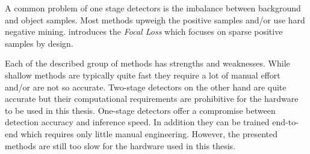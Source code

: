 	A common problem of one stage detectors is the imbalance between background and object samples. Most methods upweigh the positive samples and/or use hard negative mining. \cite{Lin} introduces the \textit{Focal Loss} which focuses on sparse positive samples by design.
	
	Each of the described group of methods has strengths and weaknesses. While shallow methods are typically quite fast they require a lot of manual effort and/or are not so accurate. Two-stage detectors on the other hand are quite accurate but their computational requirements are prohibitive for the hardware to be used in this thesis. One-stage detectors offer a compromise between detection accuracy and inference speed. In addition they can be trained end-to-end which requires only little manual engineering. However, the presented methods are still too slow for the hardware used in this thesis.


	

	



